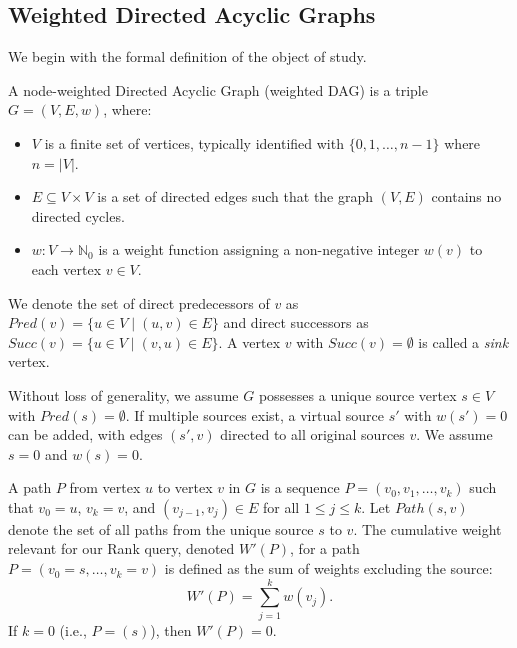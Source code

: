 \subsection*{Weighted Directed Acyclic Graphs}
\label{subsec:dag_def}

We begin with the formal definition of the object of study.

\begin{definition}
    \label{def:weighted_dag}
    A node-weighted Directed Acyclic Graph (weighted DAG) is a triple $G = (V, E, w)$, where:
    \begin{itemize}
        \item $V$ is a finite set of vertices, typically identified with $\{0, 1, \dots, n-1\}$ where $n = |V|$.
        \item $E \subseteq V \times V$ is a set of directed edges such that the graph $(V, E)$ contains no directed cycles.
        \item $w: V \to \mathbb{N}_0$ is a weight function assigning a non-negative integer $w(v)$ to each vertex $v \in V$.
    \end{itemize}
    We denote the set of direct predecessors of $v$ as $Pred(v) = \{u \in V \mid (u, v) \in E\}$ and direct successors as $Succ(v) = \{u \in V \mid (v, u) \in E\}$. A vertex $v$ with $Succ(v) = \emptyset$ is called a \emph{sink} vertex.
\end{definition}

\begin{assumption}
    \label{ass:unique_source}
    Without loss of generality, we assume $G$ possesses a unique source vertex $s \in V$ with $Pred(s) = \emptyset$. If multiple sources exist, a virtual source $s'$ with $w(s')=0$ can be added, with edges $(s', v)$ directed to all original sources $v$. We assume $s=0$ and $w(s)=0$.
\end{assumption}

\begin{definition}
    \label{def:paths_weights}
    A path $P$ from vertex $u$ to vertex $v$ in $G$ is a sequence $P = (v_0, v_1, \dots, v_k)$ such that $v_0 = u$, $v_k = v$, and $(v_{j-1}, v_j) \in E$ for all $1 \le j \le k$. Let $Path(s, v)$ denote the set of all paths from the unique source $s$ to $v$. The cumulative weight relevant for our Rank query, denoted $W'(P)$, for a path $P=(v_0=s, \dots, v_k=v)$ is defined as the sum of weights excluding the source:
    \[ W'(P) = \sum_{j=1}^{k} w(v_j). \]
    If $k=0$ (i.e., $P=(s)$), then $W'(P)=0$.
\end{definition}

